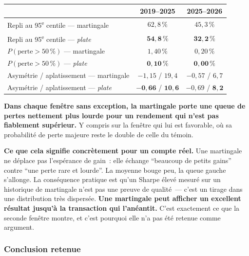 \begin{center}
\renewcommand{\arraystretch}{1.3}
\small
\begin{tabular}{lcc}
\toprule
 & \textbf{2019--2025} & \textbf{2025--2026} \\
\midrule
Repli au 95\textsuperscript{e} centile --- martingale & $62{,}8\,\%$ & $45{,}3\,\%$ \\
Repli au 95\textsuperscript{e} centile --- \emph{plate} & $\mathbf{54{,}8\,\%}$ & $\mathbf{32{,}2\,\%}$ \\
\addlinespace
$P(\text{perte} > 50\,\%)$ --- martingale & $1{,}40\,\%$ & $0{,}20\,\%$ \\
$P(\text{perte} > 50\,\%)$ --- \emph{plate} & $\mathbf{0{,}10\,\%}$ & $\mathbf{0{,}00\,\%}$ \\
\addlinespace
Asymétrie / aplatissement --- martingale & $-1{,}15$ / $19{,}4$ & $-0{,}57$ / $6{,}7$ \\
Asymétrie / aplatissement --- \emph{plate} & $\mathbf{-0{,}66}$ / $\mathbf{10{,}6}$ & $-0{,}69$ / $\mathbf{8{,}2}$ \\
\bottomrule
\end{tabular}
\end{center}

\textbf{Dans chaque fenêtre sans exception, la martingale porte une queue de pertes nettement plus lourde pour un rendement qui n'est pas fiablement supérieur.} Y compris sur la fenêtre qui lui est favorable, où sa probabilité de perte majeure reste le double de celle du témoin.

\begin{warningbox}
\textbf{Ce que cela signifie concrètement pour un compte réel.} Une martingale ne déplace pas l'espérance de gain~: elle échange \enquote{beaucoup de petits gains} contre \enquote{une perte rare et lourde}. La moyenne bouge peu, la queue gauche s'allonge. La conséquence pratique est qu'un Sharpe élevé mesuré sur un historique de martingale n'est pas une preuve de qualité~--- c'est un tirage dans une distribution très dispersée. \textbf{Une martingale peut afficher un excellent résultat jusqu'à la transaction qui l'anéantit.} C'est exactement ce que la seconde fenêtre montre, et c'est pourquoi elle n'a pas été retenue comme argument.
\end{warningbox}

\subsubsection*{Conclusion retenue}

